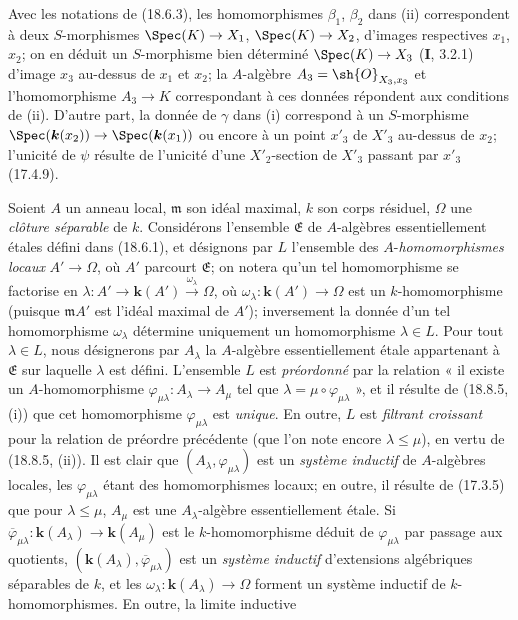 Avec les notations de (18.6.3), les homomorphismes $\beta_1$, $\beta_2$ dans (ii) correspondent à deux $S$-morphismes $\Spec(K)\to X_1$, $\Spec(K)\to X_2$, d'images respectives $x_1$, $x_2$; on en déduit un $S$-morphisme bien déterminé $\Spec(K)\to X_3$ (\textbf{I}, 3.2.1) d'image $x_3$ au-dessus de $x_1$ et $x_2$; la $A$-algèbre $A_3=\sh{O}_{X_3,x_3}$ et l'homomorphisme $A_3\to K$ correspondant à ces données répondent aux conditions de (ii). D'autre part, la donnée de $\gamma$ dans (i) correspond à un $S$-morphisme $\Spec(\boldsymbol{k}(x_2))\to\Spec(\boldsymbol{k}(x_1))$ ou encore à un point $x'_3$ de $X'_3$ au-dessus de $x_2$; l'unicité de $\psi$ résulte de l'unicité d'une $X'_2$-section de $X'_3$ passant par $x'_3$ (17.4.9).

\begin{env}[18.8.6]
\label{IV.18.8.6}
Soient $A$ un anneau local, $\mathfrak m$ son idéal maximal, $k$ son corps résiduel, $\Omega$ une \emph{clôture séparable} de $k$. Considérons l'ensemble $\mathfrak E$ de $A$-algèbres essentiellement étales défini dans (18.6.1), et désignons par $L$ l'ensemble des $A$-\emph{homomorphismes locaux} $A'\to\Omega$, où $A'$ parcourt $\mathfrak E$; on notera qu'un tel homomorphisme se factorise en $\lambda:A'\longrightarrow\boldsymbol{k}(A')\xrightarrow{\omega_\lambda}\Omega$,
où $\omega_\lambda:\boldsymbol{k}(A')\to\Omega$ est un $k$-homomorphisme (puisque $\mathfrak mA'$ est l'idéal maximal de $A'$); inversement la donnée d'un tel homomorphisme $\omega_\lambda$ détermine uniquement un homomorphisme $\lambda\in L$. Pour tout $\lambda\in L$, nous désignerons par $A_\lambda$ la $A$-algèbre essentiellement étale appartenant à $\mathfrak E$ sur laquelle $\lambda$ est défini. L'ensemble $L$ est \emph{préordonné} par la relation « il existe un $A$-homomorphisme $\varphi_{\mu\lambda}:A_\lambda\to A_\mu$ tel que $\lambda=\mu\circ\varphi_{\mu\lambda}$ », et il résulte de (18.8.5, (i)) que cet homomorphisme $\varphi_{\mu\lambda}$ est \emph{unique}. En outre, $L$ est \emph{filtrant croissant} pour la relation de préordre précédente (que l'on note encore $\lambda\leq\mu$), en vertu
de (18.8.5, (ii)). Il est clair que $(A_\lambda,\varphi_{\mu\lambda})$ est un \emph{système inductif} de $A$-algèbres locales, les $\varphi_{\mu\lambda}$ étant des homomorphismes locaux; en outre, il résulte de (17.3.5) que pour $\lambda\leq\mu$, $A_\mu$ est une $A_\lambda$-algèbre essentiellement étale. Si $\overline\varphi_{\mu\lambda}:\boldsymbol{k}(A_\lambda)\to\boldsymbol{k}(A_\mu)$ est le $k$-homomorphisme déduit de $\varphi_{\mu\lambda}$ par passage aux quotients, $(\boldsymbol{k}(A_\lambda),\overline\varphi_{\mu\lambda})$ est un \emph{système inductif} d'extensions algébriques séparables de $k$, et les $\omega_\lambda:\boldsymbol{k}(A_\lambda)\to\Omega$ forment un système inductif de $k$-homomorphismes. En outre, la limite inductive

\end{env}
